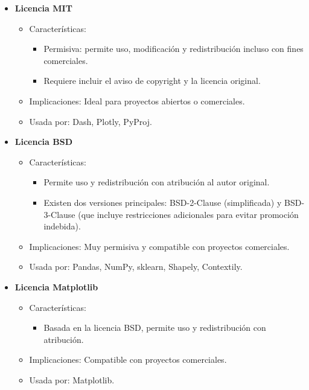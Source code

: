 \begin{itemize}
    \item \textbf{Licencia MIT}  
        \begin{itemize}
            \item Características:
                \begin{itemize}
                    \item Permisiva: permite uso, modificación y redistribución incluso con fines comerciales.
                    \item Requiere incluir el aviso de copyright y la licencia original.
                \end{itemize}
            \item Implicaciones: Ideal para proyectos abiertos o comerciales.
            \item Usada por: Dash, Plotly, PyProj.
        \end{itemize}

    \item \textbf{Licencia BSD}  
        \begin{itemize}
            \item Características:
                \begin{itemize}
                    \item Permite uso y redistribución con atribución al autor original.
                    \item Existen dos versiones principales: BSD-2-Clause (simplificada) y BSD-3-Clause (que incluye restricciones adicionales para evitar promoción indebida).
                \end{itemize}
            \item Implicaciones: Muy permisiva y compatible con proyectos comerciales.
            \item Usada por: Pandas, NumPy, sklearn, Shapely, Contextily.
        \end{itemize}

    \item \textbf{Licencia Matplotlib}  
        \begin{itemize}
            \item Características:
                \begin{itemize}
                    \item Basada en la licencia BSD, permite uso y redistribución con atribución.
                \end{itemize}
            \item Implicaciones: Compatible con proyectos comerciales.
            \item Usada por: Matplotlib.
        \end{itemize}


\end{itemize}
